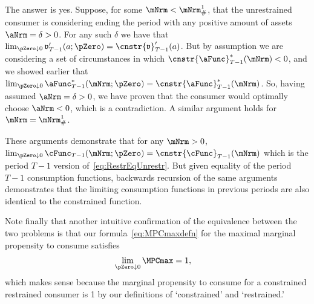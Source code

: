 \documentclass[\econtexRoot/BufferStockTheory]{subfiles}
\begin{document}
The answer is yes.
Suppose, for some $\mNrm < \mNrm^{1}_{\#}$, that the unrestrained consumer is considering ending the period with any positive amount of assets $\aNrm=\delta > 0$.
For any such $\delta$ we have that $\lim_{\pZero \downarrow 0} \mathfrak{v}_{T-1}^{\prime}(a;\pZero)=\cnstr{\mathfrak{v}}_{T-1}^{\prime}(a)$.
But by assumption we are considering a set of circumstances in which $\cnstr{\aFunc}_{T-1}^{*}(\mNrm) < 0$, and we showed earlier that $\lim_{\pZero \downarrow 0} \aFunc_{T-1}^{*}(\mNrm;\pZero) = \cnstr{\aFunc}_{T-1}^{*}(\mNrm)$.
So, having assumed $\aNrm = \delta > 0$, we have proven that the consumer would optimally choose $\aNrm < 0$, which is a contradiction.
A similar argument holds for $\mNrm = \mNrm^{1}_{\#}$.

These arguments demonstrate that for any $\mNrm>0$, $\lim_{\pZero \downarrow 0} \cFunc_{T-1}(\mNrm;\pZero) = \cnstr{\cFunc}_{T-1}(\mNrm)$ which is the period $T-1$ version of~\eqref{eq:RestrEqUnrestr}.
But given equality of the period $T-1$ consumption functions, backwards recursion of the same arguments demonstrates that the limiting consumption functions in previous periods are also identical to the constrained function.

Note finally that another intuitive confirmation of the equivalence between the two problems is that our formula~\eqref{eq:MPCmaxdefn} for the maximal marginal propensity to consume satisfies
\begin{eqnarray*}
  \lim_{\pZero \downarrow 0} \MPCmax  & = 1,
\end{eqnarray*}
which makes sense because the marginal propensity to consume for a constrained restrained consumer is 1 by our definitions of `constrained' and `restrained.'

\ifSubfilesClassLoaded{\bibfilesfind{\texname}}{}
\end{document}
